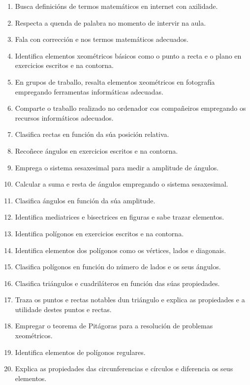 \begin{enumerate}[label=\bfseries Est\arabic*, align=left, leftmargin=1.5cm]
    \item\label{est:definicions} Busca definicións de termos matemáticos en internet con axilidade.
    \item\label{est:turnopalabra} Respecta a quenda de palabra no momento de intervir na aula.
    \item\label{est:falacorrecion} Fala con corrección e nos termos matemáticos adecuados.
    \item\label{est:puntorecta} Identifica elementos xeométricos básicos como o punto a recta e o plano en exercicios escritos e na contorna.
    \item\label{est:resaltar} En grupos de traballo, resalta elementos xeométricos en fotografía empregando ferramentas informáticas adecuadas.
    \item\label{est:compartir} Comparte o traballo realizado no ordenador cos compañeiros empregando os recursos informáticos adecuados.
    \item\label{est:posrectas} Clasifica rectas en función da súa posición relativa.
    \item\label{est:angulos} Recoñece ángulos en exercicios escritos e na contorna.
    \item\label{est:sexasesimal} Emprega o sistema sesaxesimal para medir a amplitude de ángulos.
    \item\label{est:sumarestaangulos} Calcular a suma e resta de ángulos empregando o sistema sesaxesimal.
    \item\label{est:clasangulos} Clasifica ángulos en función da súa amplitude.
    \item\label{est:mediatriz} Identifica mediatrices e bisectrices en figuras e sabe trazar elementos.
    \item\label{est:poligonos} Identifica polígonos en exercicios escritos e na contorna.
    \item\label{est:elementospoligonos} Identifica elementos dos polígonos como os vértices, lados e diagonais.
    \item\label{est:claspoligolados} Clasifica polígonos en función do número de lados e os seus ángulos.
    \item\label{est:claspoligonos} Clasifica triángulos e cuadriláteros en función das súas propiedades.
    \item\label{est:puntosnotables} Traza os puntos e rectas notables dun triángulo e explica as propiedades e a utilidade destes puntos e rectas.
    \item\label{est:pitagoras} Empregar o teorema de Pitágoras para a resolución de problemas xeométricos.
    \item\label{est:elementosregulares} Identifica elementos de polígonos regulares.
    \item\label{est:circunferencia} Explica as propiedades das circunferencias e círculos e diferencia os seus elementos.
  \end{enumerate}

